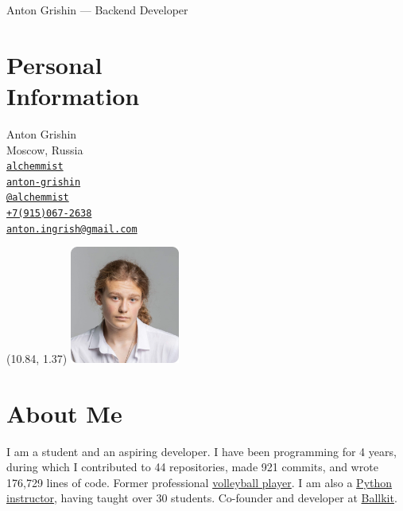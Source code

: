 \documentclass[margin,line]{resume}
\begin{document}
{\vspace*{-13mm}\sc \large Anton Grishin --- Backend Developer} \\
\begin{resume}
  \begin{minipage}[t]{0.55\textwidth}
    \section{\mysidestyle Personal\\Information}
    Anton Grishin \\
    Moscow, Russia \\
    \faGithub  \space
    \href{https://github.com/alchemmist/}{\texttt{alchemmist}} \\
    \faLinkedin \space
    \href{https://www.linkedin.com/in/anton-grishin-6966a8362/}{\texttt{anton-grishin}}
    \\
    \faPaperPlane \space \href{https://t.me/alchemmist}{\texttt{@alchemmist}} \\
    \faPhone \space
    \href{tel:+1234567890}{\color{blue}\texttt{+7(915)067-2638}}  \\
    \faEnvelope \space
    \href{mailto:anton.ingrish@gmail.com}{\color{blue}\texttt{anton.ingrish@gmail.com}}
  \end{minipage}

  \begin{minipage}[H]{0.18\textwidth}
    \begin{textblock}{7}(10.84, 1.37)
      \includegraphics[width=0.27\textwidth]{../images/avatar.png}
    \end{textblock}
  \end{minipage}

  \vspace{-7mm}
  \section{\mysidestyle About Me}
  I am a student and an aspiring developer. I have been programming
  for 4 years, during which I contributed to 44 repositories, made
  921 commits, and wrote 176,729 lines of code. Former professional
  \href{https://alchemmist.github.io/CV/attachments/sport.pdf}{volleyball
  player}. I am also a
  \href{https://www.avito.ru/moskva/predlozheniya_uslug/prepodavatel_programmirovaniya_na_python_2556461612}{Python
  instructor}, having taught over 30 students. Co-founder and
  developer at \href{https://ballkit.ru/}{Ballkit}.


\end{resume}
\end{document}
